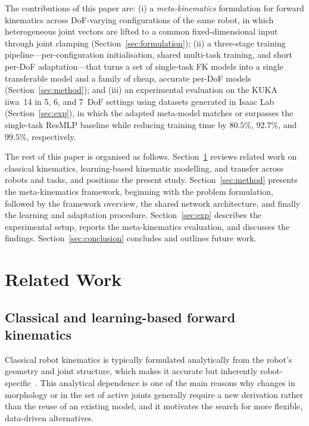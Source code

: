 \documentclass[conference]{IEEEtran}
\begin{document}
The contributions of this paper are: (i) a \emph{meta-kinematics} formulation for forward kinematics across DoF-varying configurations of the same robot, in which heterogeneous joint vectors are lifted to a common fixed-dimensional input through joint clamping (Section~\ref{sec:formulation}); (ii) a three-stage training pipeline---per-configuration initialisation, shared multi-task training, and short per-DoF adaptation---that turns a set of single-task FK models into a single transferable model and a family of cheap, accurate per-DoF models (Section~\ref{sec:method}); and (iii) an experimental evaluation on the KUKA iiwa~14 in 5, 6, and 7~DoF settings using datasets generated in Isaac Lab (Section~\ref{sec:exp}), in which the adapted meta-model matches or surpasses the single-task ResMLP baseline while reducing training time by $80.5\%$, $92.7\%$, and $99.5\%$, respectively.

The rest of this paper is organised as follows. Section~\ref{sec:related} reviews related work on classical kinematics, learning-based kinematic modelling, and transfer across robots and tasks, and positions the present study. Section~\ref{sec:method} presents the meta-kinematics framework, beginning with the problem formulation, followed by the framework overview, the shared network architecture, and finally the learning and adaptation procedure. Section~\ref{sec:exp} describes the experimental setup, reports the meta-kinematics evaluation, and discusses the findings. Section~\ref{sec:conclusion} concludes and outlines future work.

\section{Related Work}
\label{sec:related}

\subsection{Classical and learning-based forward kinematics}
Classical robot kinematics is typically formulated analytically from the robot's geometry and joint structure, which makes it accurate but inherently robot-specific~\cite{siciliano2009}. This analytical dependence is one of the main reasons why changes in morphology or in the set of active joints generally require a new derivation rather than the reuse of an existing model, and it motivates the search for more flexible, data-driven alternatives.
\end{document}

